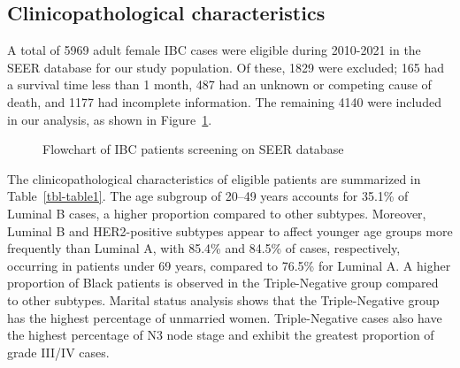 \documentclass[
  letterpaper,
  DIV=11,
  numbers=noendperiod]{scrartcl}
\begin{document}
\subsection{Clinicopathological
characteristics}\label{clinicopathological-characteristics}

A total of 5969 adult female IBC cases were eligible during 2010-2021 in
the SEER database for our study population. Of these, 1829 were
excluded; 165 had a survival time less than 1 month, 487 had an unknown
or competing cause of death, and 1177 had incomplete information. The
remaining 4140 were included in our analysis, as shown in
Figure~\ref{fig-flowchart}.

\begin{figure}


\caption{\label{fig-flowchart}{Flowchart of IBC patients screening on
SEER database}}

\end{figure}%

The clinicopathological characteristics of eligible patients are
summarized in Table~\ref{tbl-table1}. The age subgroup of 20--49 years
accounts for 35.1\% of Luminal B cases, a higher proportion compared to
other subtypes. Moreover, Luminal B and HER2-positive subtypes appear to
affect younger age groups more frequently than Luminal A, with 85.4\%
and 84.5\% of cases, respectively, occurring in patients under 69 years,
compared to 76.5\% for Luminal A. A higher proportion of Black patients
is observed in the Triple-Negative group compared to other subtypes.
Marital status analysis shows that the Triple-Negative group has the
highest percentage of unmarried women. Triple-Negative cases also have
the highest percentage of N3 node stage and exhibit the greatest
proportion of grade III/IV cases.
\end{document}
